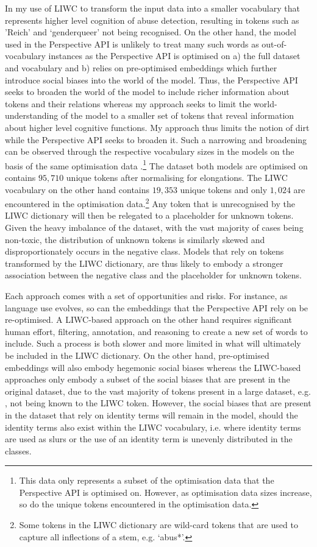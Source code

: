 In my use of LIWC to transform the input data into a smaller vocabulary that represents higher level cognition of abuse detection, resulting in tokens such as 'Reich' and `genderqueer' not being recognised.
On the other hand, the model used in the Perspective API is unlikely to treat many such words as out-of-vocabulary instances as the Perspective API is optimised on a) the full dataset and vocabulary and b) relies on pre-optimised embeddings which further introduce social biases into the world of the model.
Thus, the Perspective API seeks to broaden the world of the model to include richer information about tokens and their relations whereas my approach seeks to limit the world-understanding of the model to a smaller set of tokens that reveal information about higher level cognitive functions.
My approach thus limits the notion of dirt while the Perspective API seeks to broaden it.
Such a narrowing and broadening can be observed through the respective vocabulary sizes in the models on the basis of the same optimisation data \citep{Wulczyn:2017}.\footnote{This data only represents a subset of the optimisation data that the Perspective API is optimised on. However, as optimisation data sizes increase, so do the unique tokens encountered in the optimisation data.}
The dataset both models are optimised on contains $95,710$ unique tokens after normalising for elongations.
The LIWC vocabulary on the other hand contains $19,353$ unique tokens and only $1,024$ are encountered in the optimisation data.\footnote{Some tokens in the LIWC dictionary are wild-card tokens that are used to capture all inflections of a stem, e.g. `abus*'.}
Any token that is unrecognised by the LIWC dictionary will then be relegated to a placeholder for unknown tokens.
Given the heavy imbalance of the dataset, with the vast majority of cases being non-toxic, the distribution of unknown tokens is similarly skewed and disproportionately occurs in the negative class.
Models that rely on tokens transformed by the LIWC dictionary, are thus likely to embody a stronger association between the negative class and the placeholder for unknown tokens.

Each approach comes with a set of opportunities and risks.
For instance, as language use evolves, so can the embeddings that the Perspective API rely on be re-optimised.
A LIWC-based approach on the other hand requires significant human effort, filtering, annotation, and reasoning to create a new set of words to include.
Such a process is both slower and more limited in what will ultimately be included in the LIWC dictionary.
On the other hand, pre-optimised embeddings will also embody hegemonic social biases \citep{Bender:2021} whereas the LIWC-based approaches only embody a subset of the social biases that are present in the original dataset, due to the vast majority of tokens present in a large dataset, e.g. \citep{Wulczyn:2017}, not being known to the LIWC token.
However, the social biases that are present in the dataset that rely on identity terms will remain in the model, should the identity terms also exist within the LIWC vocabulary, i.e. where identity terms are used as slurs or the use of an identity term is unevenly distributed in the classes.

